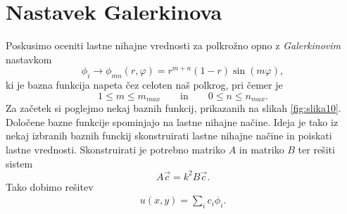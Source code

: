 \documentclass[12pt,a4paper]{article}
\begin{document}
\section*{Nastavek Galerkinova}

Poskusimo oceniti lastne nihajne vrednosti za polkrožno opno z \textit{Galerkinovim} nastavkom
\begin{equation} \label{eq:enacba6}
\phi_i \rightarrow \phi _{mn}(r,\varphi) = r^{m+n} (1-r) \sin(m \varphi),
\end{equation}
ki je bazna funkcija napeta čez celoten naš polkrog, pri čemer je
\begin{equation*}
1 \leq m \leq m_{max} \qquad  \textrm{in} \qquad 0 \leq n \leq n_{max}.
\end{equation*}
Za začetek si poglejmo nekaj baznih funkcij, prikazanih na slikah \ref{fig:slika10}. Določene bazne funkcije spominjajo na lastne nihajne načine. Ideja je tako iz nekaj izbranih baznih funckij skonstruirati lastne nihajne načine in poiskati lastne vrednosti. Skonstruirati je potrebno matriko $A$ in matriko $B$ ter rešiti sistem
\begin{equation*}
A \vec{c} = k^{2} B \vec{c}.
\end{equation*}
Tako dobimo rešitev
\begin{align*}
u(x,y)= \sum _i c_i \phi _i.
\end{align*}
\end{document}

